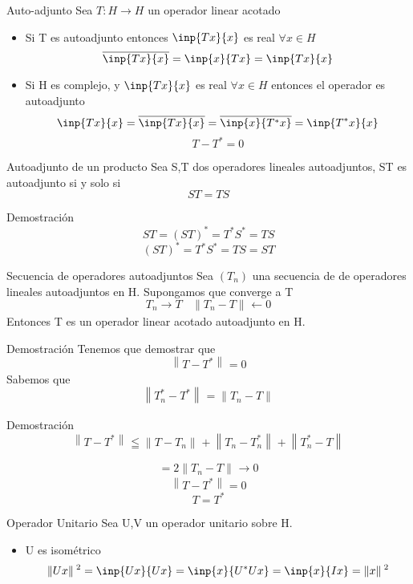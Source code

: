 \documentclass{beamer}
\newcommand{\norma}[2][]{\ensuremath{\left\lVert #2 \right\rVert_{#1}}}
\begin{document}
\begin{frame}{Auto-adjunto}
  Sea $T:H\longrightarrow H$ un operador linear acotado
  \begin{itemize}
    \item Si T es autoadjunto entonces $\inp{Tx}{x}$ es real $\forall
      x \in H$
      $$\overline{\inp{Tx}{x}} = \inp{x}{Tx} = \inp{Tx}{x}$$
  \end{itemize}
\end{frame}
\begin{frame}
  \begin{itemize}
    \item Si H es complejo, y $\inp{Tx}{x}$ es real $\forall x \in H$
      entonces el operador es autoadjunto
      $$\inp{Tx}{x} = \overline{\inp{Tx}{x}} = \overline{\inp{x}{T^*x}}
      = \inp{T^*x}{x}$$
      $$T - T^* = 0$$
  \end{itemize}
\end{frame}
\begin{frame}{Autoadjunto de un producto}
  Sea S,T dos operadores lineales autoadjuntos, ST es autoadjunto si y
  solo si 
  $$ST=TS$$
\end{frame}
\begin{frame}{Demostración}
  $$ ST =(ST)^* = T^*S^* = TS$$
  $$ (ST)^* = T^*S^* = TS = ST $$
\end{frame}

\begin{frame}{Secuencia de operadores autoadjuntos}
  Sea $(T_n)$ una secuencia de de operadores lineales autoadjuntos en
  H. Supongamos que converge a T
  $$T_n\longrightarrow T~~~~\norma{T_n-T}{}\longleftarrow 0$$
  Entonces T es un operador linear acotado autoadjunto en H.
\end{frame}
\begin{frame}{Demostración}
  Tenemos que demostrar que 
  $$\norma{T-T^*}{} = 0$$
  Sabemos que
  $$\norma{T_n^*-T^*}{} = \norma{T_n-T}{}$$

\end{frame} 
\begin{frame}{Demostración}
$$\norma{T-T^*}{}\leqq \norma{T-T_n}{} +\norma{T_n-T_n^*}{}+ \norma{T_n^*-T}{}$$

$$=2\norma{T_n-T}{}\longrightarrow 0 $$
$$\norma{T-T^*}{} = 0$$
$$T=T^*$$
\end{frame}

\begin{frame}{Operador Unitario}
  Sea U,V un operador unitario sobre H.
  \begin{itemize}
    \item U es isométrico 
      $$\norma{Ux}{}^2=\inp{Ux}{Ux}=\inp{x}{U^*Ux} =
      \inp{x}{Ix}=\norma{x}{}^2$$
  \end{itemize}
\end{frame}
\end{document}
